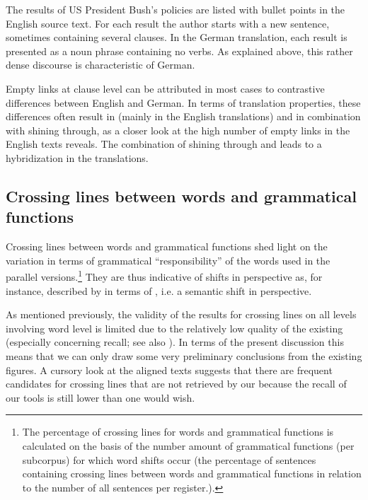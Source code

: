 \documentclass[output=paper]{LSP/langsci}
\begin{document}
The results of US President Bush's policies are listed with bullet points in the English source text. For each result the author starts with a new sentence, sometimes containing several clauses. In the German translation, each result is presented as a noun phrase containing no verbs. As explained above, this rather dense discourse  is characteristic of German. 

Empty links at clause level can be attributed in most cases to contrastive differences between English and German. In terms of translation properties, these differences often result in  (mainly in the English translations) and  in combination with  shining through, as a closer look at the high number of empty links in the English texts reveals. The combination of  shining through and   leads to a hybridization in the translations.

\subsection{Crossing lines between words and grammatical functions}\label{sec:culo:4.3}
 
Crossing lines between words and grammatical functions shed light on the variation in terms of grammatical ``responsibility'' of the words used in the parallel versions.\footnote{The percentage of crossing lines for words and grammatical functions is calculated on the basis of the number amount of grammatical functions (per subcorpus) for which word shifts occur (the percentage of sentences containing crossing lines between words and grammatical functions in relation to the number of all sentences per register.).} They are thus indicative of shifts in perspective as, for instance, described by \citet{Vinay1958} in terms of , i.e. a semantic shift in perspective. 
 



As mentioned previously, the validity of the  results for crossing lines on all levels involving word level is limited due to the relatively low quality of the existing  (especially concerning recall; see also 
). In terms of the present discussion this means that we can only draw some very preliminary conclusions from the existing figures. A cursory look at the aligned texts suggests that there are frequent candidates for crossing lines that are not retrieved by our  because the recall of our  tools is still lower than one would wish. 
\end{document}
